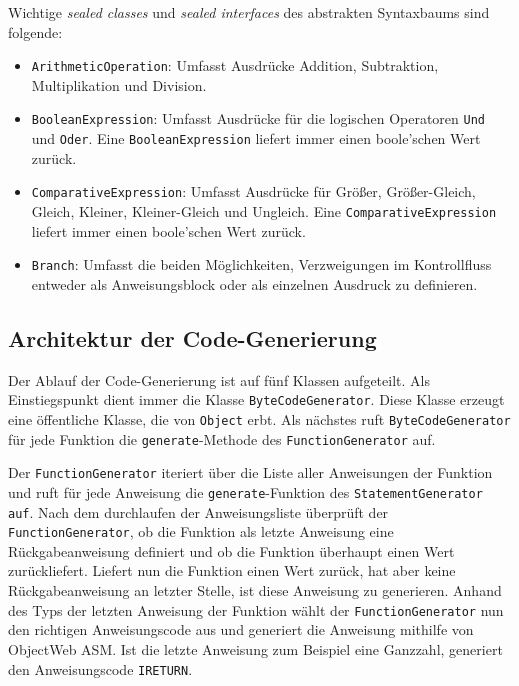 Wichtige \textit{sealed classes} und \textit{sealed interfaces} des abstrakten Syntaxbaums sind folgende:

\begin{itemize}
    \item \texttt{ArithmeticOperation}: Umfasst Ausdrücke Addition, Subtraktion, Multiplikation und Division.
    \item \texttt{BooleanExpression}: Umfasst Ausdrücke für die logischen Operatoren \texttt{Und} und \texttt{Oder}. Eine \texttt{BooleanExpression} liefert immer einen boole'schen Wert zurück.
    \item \texttt{ComparativeExpression}: Umfasst Ausdrücke für Größer, Größer-Gleich, Gleich, Kleiner, Kleiner-Gleich und Ungleich. Eine \texttt{ComparativeExpression} liefert immer einen boole'schen Wert zurück.
    \item \texttt{Branch}: Umfasst die beiden Möglichkeiten, Verzweigungen im Kontrollfluss entweder als Anweisungsblock oder als einzelnen Ausdruck zu definieren.
\end{itemize}

\subsection{Architektur der Code-Generierung}

Der Ablauf der Code-Generierung ist auf fünf Klassen aufgeteilt. Als Einstiegspunkt dient immer die Klasse \texttt{ByteCodeGenerator}. Diese Klasse erzeugt eine öffentliche Klasse, die von \texttt{Object} erbt. Als nächstes ruft \texttt{ByteCodeGenerator} für jede Funktion die \texttt{generate}-Methode des \texttt{FunctionGenerator} auf.

Der \texttt{FunctionGenerator} iteriert über die Liste aller Anweisungen der Funktion und ruft für jede Anweisung die \texttt{generate}-Funktion des \texttt{StatementGenerator auf}. Nach dem durchlaufen der Anweisungsliste überprüft der \texttt{FunctionGenerator}, ob die Funktion als letzte Anweisung eine Rückgabeanweisung definiert und ob die Funktion überhaupt einen Wert zurückliefert. Liefert nun die Funktion einen Wert zurück, hat aber keine Rückgabeanweisung an letzter Stelle, ist diese Anweisung zu generieren. Anhand des Typs der letzten Anweisung der Funktion wählt der \texttt{FunctionGenerator} nun den richtigen Anweisungscode aus und generiert die Anweisung mithilfe von ObjectWeb ASM. Ist die letzte Anweisung zum Beispiel eine Ganzzahl, generiert \toya den Anweisungscode \texttt{IRETURN}.

